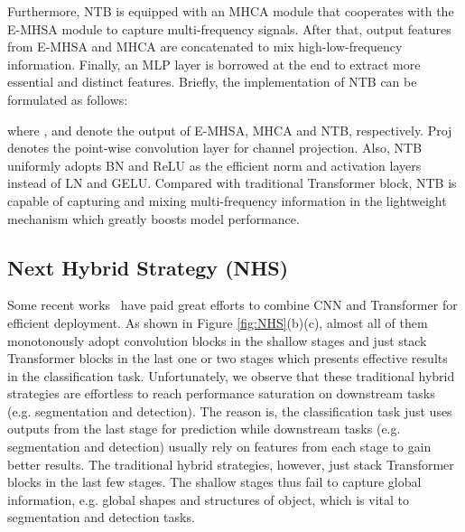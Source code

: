 \documentclass[10pt,twocolumn,letterpaper]{article}
\begin{document}
Furthermore, NTB is equipped with an MHCA module that cooperates with the E-MHSA module to capture multi-frequency signals. After that, output features from E-MHSA and MHCA are concatenated to mix high-low-frequency information. Finally, an MLP layer is borrowed at the end to extract more essential and distinct features. Briefly, the implementation of NTB can be formulated as follows:

where ,  and  denote the output of E-MHSA, MHCA and NTB, respectively. Proj denotes the point-wise convolution layer for channel projection. Also, NTB uniformly adopts BN and ReLU as the efficient norm and activation layers instead of LN and GELU. Compared with traditional Transformer block, NTB is capable of capturing and mixing multi-frequency information in the lightweight mechanism which greatly boosts model performance. 

\subsection{Next Hybrid Strategy (NHS)}
Some recent works~\cite{CoAtNet, li2022efficientformer, MobileViT, xia2022trt} have paid great efforts to combine CNN and Transformer for efficient deployment. 
As shown in Figure \ref{fig:NHS}(b)(c), almost all of them monotonously adopt convolution blocks in the shallow stages and just stack Transformer blocks in the last one or two stages which presents effective results in the classification task. Unfortunately, we observe that these traditional hybrid strategies are effortless to reach performance saturation on downstream tasks (e.g. segmentation and detection). 
The reason is, the classification task just uses outputs from the last stage for prediction while downstream tasks (e.g. segmentation and detection) usually rely on features from each stage to gain better results. The traditional hybrid strategies, however, just stack Transformer blocks in the last few stages. The shallow stages thus fail to capture global information, e.g. global shapes and structures of object,  which is vital to segmentation and detection tasks.
\end{document}
